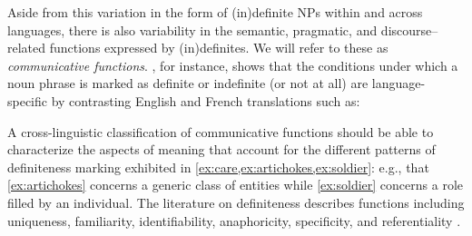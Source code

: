 \documentclass[11pt,letterpaper]{article}
\newcommand{\llbl}[1]{\mbox{\textsc{#1}}} %
\begin{document}
Aside from this variation in the form of (in)definite NPs within and across languages, there is also variability 
in the semantic, pragmatic, and discourse--related functions expressed by (in)definites.   
We will refer to these as {\em communicative functions}.  
, for instance, shows that the conditions under which a noun phrase 
is marked as definite or indefinite (or not at all) 
are language-specific by contrasting English and French translations such as:

\begin{small}
\end{small}
A cross-linguistic classification of communicative functions  
should be able to characterize the aspects of meaning that account for the different patterns of definiteness marking 
exhibited in \cref{ex:care,ex:artichokes,ex:soldier}: e.g., that \cref{ex:artichokes} concerns a generic class of entities while 
\cref{ex:soldier} concerns a role filled by an individual.
The literature on definiteness describes functions including 
uniqueness, familiarity, identifiability, anaphoricity, specificity, and 
referentiality \citep[\textit{inter alia}]{birner94,condoravdi92,evans77,evans80,gundel88,gundel93,heim90,kadmon87,kadmon90,lyons99,prince92,roberts03,russell05}.  
\end{document}
